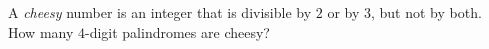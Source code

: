 A \emph{cheesy} number is an integer that is divisible by $2$ or by $3$, but not by both. How many $4$-digit palindromes are cheesy?
